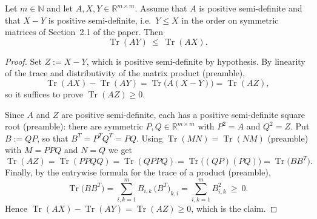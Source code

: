 \begin{lemma}
Let $m\in\mathbb{N}$ and let $A,X,Y\in\mathbb{R}^{m\times m}$. Assume that $A$ is positive
semi-definite and that $X-Y$ is positive semi-definite, i.e.\ $Y\leq X$ in the order on symmetric
matrices of Section~2.1 of the paper. Then
$$\operatorname{Tr}(AY)\ \leq\ \operatorname{Tr}(AX).$$
\end{lemma}
\begin{proof}
Set $Z:=X-Y$, which is positive semi-definite by hypothesis. By linearity of the trace and
distributivity of the matrix product (preamble),
$$\operatorname{Tr}(AX)-\operatorname{Tr}(AY)=\operatorname{Tr}\big(A(X-Y)\big)
=\operatorname{Tr}(AZ),$$
so it suffices to prove $\operatorname{Tr}(AZ)\geq0$.

Since $A$ and $Z$ are positive semi-definite, each has a positive semi-definite square root
(preamble): there are symmetric $P,Q\in\mathbb{R}^{m\times m}$ with $P^2=A$ and $Q^2=Z$. Put
$B:=QP$, so that $B^T=P^TQ^T=PQ$. Using $\operatorname{Tr}(MN)=\operatorname{Tr}(NM)$ (preamble)
with $M=PPQ$ and $N=Q$ we get
$$\operatorname{Tr}(AZ)=\operatorname{Tr}(PPQQ)=\operatorname{Tr}(QPPQ)
=\operatorname{Tr}\big((QP)(PQ)\big)=\operatorname{Tr}\big(BB^T\big).$$
Finally, by the entrywise formula for the trace of a product (preamble),
$$\operatorname{Tr}\big(BB^T\big)=\sum_{i,k=1}^m B_{i,k}\,\big(B^T\big)_{k,i}
=\sum_{i,k=1}^m B_{i,k}^2\ \geq\ 0 .$$
Hence $\operatorname{Tr}(AX)-\operatorname{Tr}(AY)=\operatorname{Tr}(AZ)\geq0$, which is the
claim.
\end{proof}
